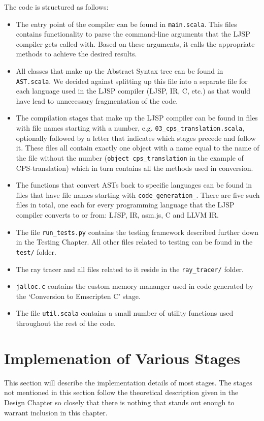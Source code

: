 \documentclass[11pt]{report}
\begin{document}
The code is structured as follows:
\begin{itemize}
\item The entry point of the compiler can be found in \texttt{main.scala}. This files contains functionality to parse the command-line arguments that the LJSP compiler gets called with. Based on these arguments, it calls the appropriate methods to achieve the desired results.
\item All classes that make up the Abstract Syntax tree can be found in \texttt{AST.scala}. We decided against splitting up this file into a separate file for each language used in the LJSP compiler (LJSP, IR, C, etc.) as that would have lead to unnecessary fragmentation of the code.
\item The compilation stages that make up the LJSP compiler can be found in files with file names starting with a number, e.g. \texttt{03_cps_translation.scala}, optionally followed by a letter that indicates which stages precede and follow it. These files all contain exactly one object with a name equal to the name of the file without the number (\texttt{object cps_translation} in the example of CPS-translation) which in turn contains all the methods used in conversion. 
\item The functions that convert ASTs back to specific languages can be found in files that have file names starting with \texttt{code_generation_}. There are five such files in total, one each for every programming language that the LJSP compiler converts to or from: LJSP, IR, asm.js, C and LLVM IR.
\item The file \texttt{run_tests.py} contains the testing framework described further down in the Testing Chapter. All other files related to testing can be found in the \texttt{test/} folder.
\item The ray tracer and all files related to it reside in the \texttt{ray_tracer/} folder.
\item \texttt{jalloc.c} contains the custom memory mananger used in code generated by the `Conversion to Emscripten C' stage.
\item The file \texttt{util.scala} contains a small number of utility functions used throughout the rest of the code.
\end{itemize}

\section{Implemenation of Various Stages}
This section will describe the implementation details of most stages. The stages not mentioned in this section follow the theoretical description given in the Design Chapter so closely that there is nothing that stands out enough to warrant inclusion in this chapter.
\end{document}
